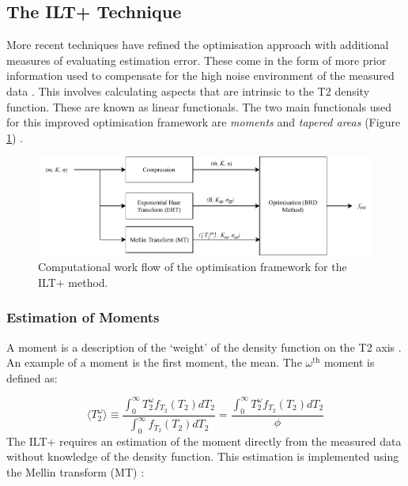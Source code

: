 \subsection{The ILT+ Technique}
More recent techniques have refined the optimisation approach with additional measures of evaluating estimation error. These come in the form of more prior information used to compensate for the high noise environment of the measured data \cite{GruberT2Estimation2013}. This involves calculating aspects that are intrinsic to the T2 density function. These are known as linear functionals. The two main functionals used for this improved optimisation framework are \textit{moments} and \textit{tapered areas} (Figure \ref{fig:2013ILTXOptimisation}) \cite{GruberT2Estimation2013}.


\begin{figure}[ht!]
    \centering
    \includegraphics[width=\textwidth]{2013_ILT+.pdf}
    \caption{Computational work flow of the optimisation framework for the ILT+ method.}
    \label{fig:2013ILTXOptimisation}
\end{figure}

\subsubsection{Estimation of Moments} \label{section:moment_estimation}
A moment is a description of the `weight' of the density function on the T2 axis \cite{VenkMellin2010}. An example of a moment is the first moment, the mean. The $\omega^{\text{th}}$ moment is defined as:

\begin{equation}
    \langle T_2^{\omega}  \rangle \equiv
    \frac
    {\int_{0}^{\infty}  T_2^{\omega} f_{T_2}(T_2)dT_2}
    {\int_{0}^{\infty}  f_{T_2}(T_2)dT_2 }
    =     
    \frac
    {\int_{0}^{\infty}  T_2^{\omega} f_{T_2}(T_2)dT_2}
    {\phi}
    \label{eq:defnMoment}
\end{equation}
The ILT+ requires an estimation of the moment directly from the measured data without knowledge of the density function. This estimation is implemented using the Mellin transform (MT) \cite{VenkMellin2010}:


